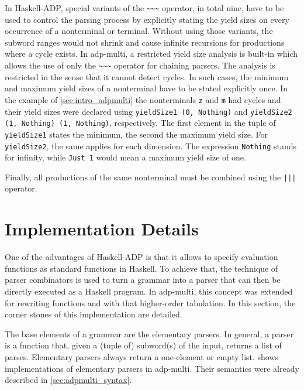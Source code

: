 \documentclass[
    a4paper,
    12pt,
    twoside,
    BCOR=12mm,
    parskip=half,
    chapterprefix,
    numbers=noenddot,
    bibliography=totoc
]{scrbook}
\begin{document}
In Haskell-ADP, special variants of the \verb|~~~| operator, in total nine, have to be used to control the parsing process by explicitly stating the yield sizes on every occurrence of a nonterminal or terminal. Without using those variants, the subword ranges would not shrink and cause infinite recursions for productions where a cycle exists.
In adp-multi, a restricted yield size analysis is built-in which allows the use of only the \verb|~~~| operator for chaining parsers. The analysis is restricted in the sense that it cannot detect cycles. In such cases, the minimum and maximum yield sizes of a nonterminal have to be stated explicitly once. In the example of \cref{sec:intro_adpmulti} the nonterminals \verb|z| and \verb|m| had cycles and their yield sizes were declared using \verb|yieldSize1 (0, Nothing)| and \verb|yieldSize2 (1, Nothing) (1, Nothing)|, respectively. The first element in the tuple of \verb|yieldSize1| states the minimum, the second the maximum yield size. For \verb|yieldSize2|, the same applies for each dimension. The expression \verb|Nothing| stands for infinity, while \verb|Just 1| would mean a maximum yield size of one.

Finally, all productions of the same nonterminal must be combined using the \verb/|||/ operator.

\section{Implementation Details}
\label{sec:adpmulti_impl}

One of the advantages of Haskell-ADP is that it allows to specify evaluation functions as standard functions in Haskell. To achieve that, the technique of parser combinators is used to turn a grammar into a parser that can then be directly executed as a Haskell program. In adp-multi, this concept was extended for rewriting functions and with that higher-order tabulation. In this section, the corner stones of this implementation are detailed.

The base elements of a grammar are the elementary parsers. In general, a parser is a function that, given a (tuple of) subword(s) of the input, returns a list of parses. Elementary parsers always return a one-element or empty list.  shows implementations of elementary parsers in adp-multi. Their semantics were already described in \cref{sec:adpmulti_syntax}.
\end{document}
